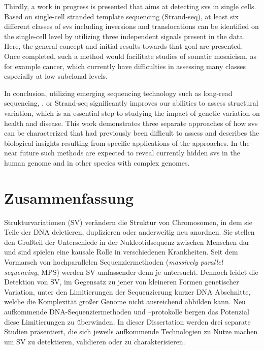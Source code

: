 Thirdly, a work in progress is presented that aims at detecting \acp{sv} in
single cells. Based on single-cell stranded template sequencing (Strand-seq),
at least six different classes of \acp{sv} including inversions and
translocations can be identified on the single-cell level by utilizing three
independent signals present in the data. Here, the general concept and initial
results towards that goal are presented. Once completed, such a method would
facilitate studies of somatic mosaicism, as for example cancer, which
currently have difficulties in assessing many \sv classes especially at low
subclonal levels.

In conclusion, utilizing emerging sequencing technology such as long-read
sequencing, \hic, or Strand-seq significantly improves our abilities to assess
structural variation, which is an essential step to studying the impact of
genetic variation on health and disease. This work demonstrates three separate
approaches of how \acp{sv} can be characterized that had previously been
difficult to assess and describes the biological insights resulting from
specific applications of the approaches. In the near future such methods are
expected to reveal currently hidden \acp{sv} in the human genome and in other
species with complex genomes.




\cleardoublepage
{}
\chapter*{Zusammenfassung}%
%

Strukturvariationen (SV) verändern die Struktur von Chromosomen, in dem sie
Teile der DNA deletieren, duplizieren oder anderweitig neu anordnen. Sie stellen
den Großteil der Unterschiede in der Nukleotidsequenz zwischen Menschen dar und
sind spielen eine kausale Rolle in verschiedenen Krankheiten. Seit dem Vormarsch
von hochparallelen Sequenziermethoden (\textit{massively parallel sequencing},
MPS) werden SV umfassender denn je untersucht. Dennoch leidet die Detektion von
SV, im Gegensatz zu jener von kleineren Formen genetischer Variation, unter den
Limitierungen der Sequenzierung kurzer DNA Abschnitte, welche die Komplexität
großer Genome nicht ausreichend abbilden kann. Neu aufkommende
DNA-Se\-quen\-zier\-me\-tho\-den und –protokolle bergen das Potenzial diese Limitierungen
zu überwinden. In dieser Dissertation werden drei separate Studien präsentiert,
die sich jeweils aufkommende Technologien zu Nutze machen um SV zu detektieren,
validieren oder zu charakterisieren.

